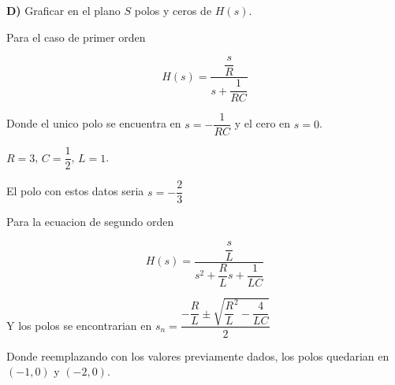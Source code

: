 \textbf{D)} Graficar en el plano $S$ polos y ceros de $H(s)$.

Para el caso de primer orden

$$H(s) = \dfrac{\dfrac{s}{R}}{s + \dfrac{1}{RC}}$$

Donde el unico polo se encuentra en $s=-\dfrac{1}{RC}$ y el cero en $s=0$.

$R = 3$, $C = \dfrac{1}{2}$, $L = 1$.

El polo con estos datos seria $s=-\dfrac{2}{3}$

\begin{figure}[H]
  \centering
\end{figure}

Para la ecuacion de segundo orden 

$$H(s) = \dfrac{\dfrac{s}{L}}{s^2 + \dfrac{R}{L} s + \dfrac{1}{LC}}$$

Y los polos se encontrarian en $s_n=\dfrac{-\dfrac{R}{L} \pm \sqrt{\dfrac{R}{L}^2-\dfrac{4}{LC}}}{2}$

Donde reemplazando con los valores previamente dados, los polos quedarian en $(-1,0)$ y $(-2,0)$.

\begin{figure}[H]
  \centering
\end{figure}

